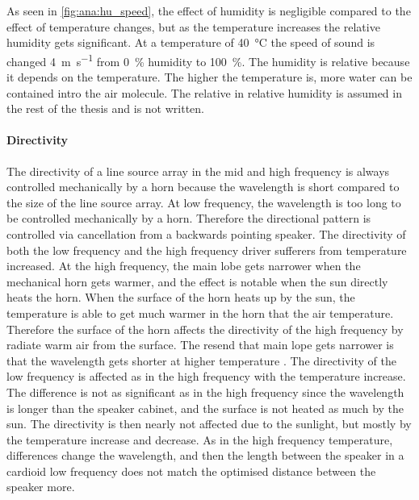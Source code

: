 
As seen in \autoref{fig:ana:hu_speed}, the effect of humidity is negligible compared to the effect of temperature changes, but as the temperature increases the relative humidity gets significant. At a temperature of \SI{40}{\celsius} the speed of sound is changed \SI{4}{\meter\per\second} from \SI{0}{\percent} humidity to \SI{100}{\percent}. The humidity is relative because it depends on the temperature. The higher the temperature is, more water can be contained intro the air molecule. The relative in relative humidity is assumed in the rest of the thesis and is not written. 


\paragraph{Directivity} The directivity of a line source array in the mid and high frequency is always controlled mechanically by a horn because the wavelength is short compared to the size of the line source array. At low frequency, the wavelength is too long to be controlled mechanically by a horn. Therefore the directional pattern is controlled via cancellation from a backwards pointing speaker. The directivity of both the low frequency and the high frequency driver sufferers from temperature increased. At the high frequency, the main lobe gets narrower when the mechanical horn gets warmer, and the effect is notable when the sun directly heats the horn. When the surface of the horn heats up by the sun, the temperature is able to get much warmer in the horn that the air temperature. Therefore the surface of the horn affects the directivity of the high frequency by radiate warm air from the surface. The resend that main lope gets narrower is that the wavelength gets shorter at higher temperature \citep{levine2018influence}. The directivity of the low frequency is affected as in the high frequency with the temperature increase. The difference is not as significant as in the high frequency since the wavelength is longer than the speaker cabinet, and the surface is not heated as much by the sun. The directivity is then nearly not affected due to the sunlight, but mostly by the temperature increase and decrease. As in the high frequency temperature, differences change the wavelength, and then the length between the speaker in a cardioid low frequency does not match the optimised distance between the speaker more. 



